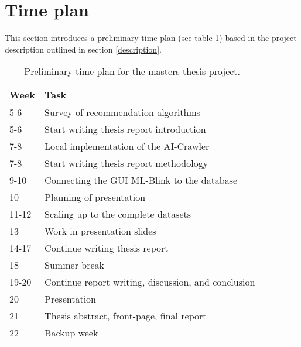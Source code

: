 \section{Time plan}

This section introduces a preliminary time plan (see table \ref{timeline:time_plan}) based in the project description outlined in section \ref{description}.

\begin{table}
  \centering
  \begin{tabularx}{\textwidth}{|l|X|}
    \hline
    Week & Task \\
    \hline
    5-6 & Survey of recommendation algorithms \\
    5-6 & Start writing thesis report introduction \\
    7-8 & Local implementation of the AI-Crawler \\
    7-8 & Start writing thesis report methodology \\
    9-10 & Connecting the GUI ML-Blink to the database \\
    10 & Planning of presentation \\
    11-12 & Scaling up to the complete datasets \\
    13 & Work in presentation slides \\
    14-17 & Continue writing thesis report \\
    18 & Summer break \\
    19-20 & Continue report writing, discussion, and conclusion \\
    20 & Presentation \\
    21 & Thesis abstract, front-page, final report \\
    22 & Backup week \\
    \hline
  \end{tabularx}
  \caption{Preliminary time plan for the masters thesis project.}
  \label{timeline:time_plan}
\end{table}